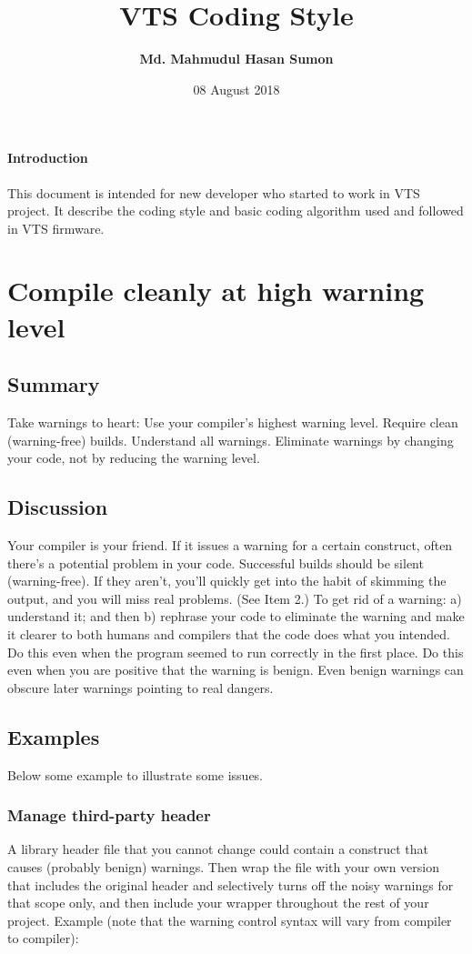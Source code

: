 \documentclass[12pt,a4paper,oneside]{article}
\title{\textbf{{VTS Coding Style}}}
\date{08 August 2018}
\author{\textbf{Md. Mahmudul Hasan Sumon}}
\begin{document}
	\maketitle
	\newpage
	\tableofcontents
	\newpage	
	
	
	\paragraph{Introduction}
	This document is intended for new developer who started to work in VTS project. It describe the coding style and basic coding algorithm used and followed in VTS firmware.
	\newpage
	\section[Warning free compilation]{Compile cleanly at high warning level}
		\subsection{Summary}
		Take warnings to heart: Use your compiler's highest warning level. Require clean (warning-free) builds. Understand all warnings. Eliminate warnings by changing your code, not by reducing the warning level.
		
		\subsection{Discussion}
		Your compiler is your friend. If it issues a warning for a certain construct, often there's a potential problem in your code. Successful builds should be silent (warning-free). If they aren't, you'll quickly get into the habit of skimming the output, and you will miss real problems. (See Item 2.) To get rid of a warning: a) understand it; and then b) rephrase your code to eliminate the warning and make it clearer to both humans and compilers that the code does
		what you intended. Do this even when the program seemed to run correctly in the first place. Do this even when you are positive that the warning is benign. Even benign warnings can obscure later warnings pointing to real dangers.
		
		\subsection{Examples}
		Below some example to illustrate some issues.
			\subsubsection{Manage third-party header}
			A library header file that you cannot change could contain a construct that causes (probably benign) warnings. Then wrap the file with your own version that includes the original header and selectively turns off the noisy warnings for that scope only, and then include your wrapper throughout the rest of your project. Example (note that the warning control syntax will vary from compiler to compiler):
			
\end{document}
